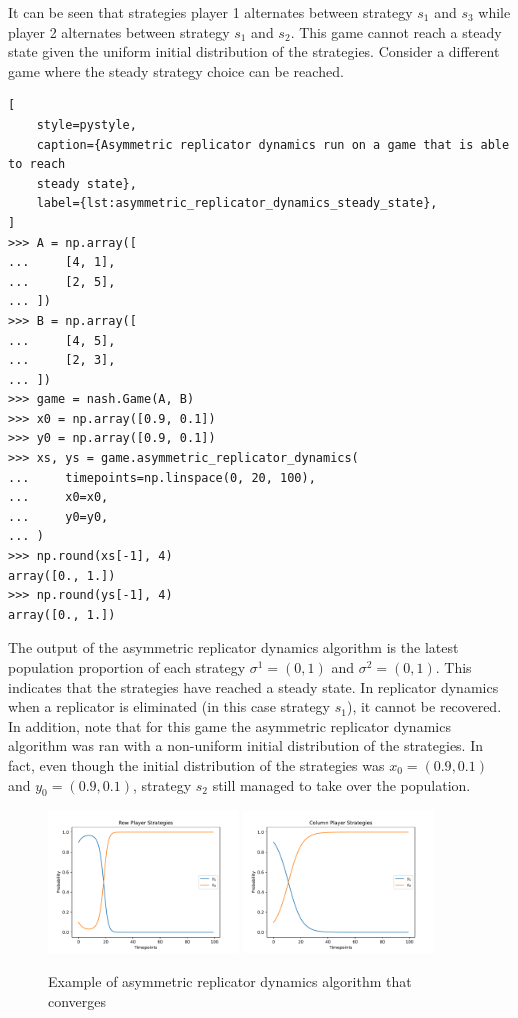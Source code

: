 It can be seen that strategies player 1 alternates between strategy \(s_1\) and
\(s_3\) while player 2 alternates between strategy \(s_1\) and \(s_2\).
This game cannot reach a steady state given the uniform initial distribution of
the strategies.
Consider a different game where the steady strategy choice can be reached.

\begin{lstlisting}[
    style=pystyle,
    caption={Asymmetric replicator dynamics run on a game that is able to reach
    steady state},
    label={lst:asymmetric_replicator_dynamics_steady_state},
]
>>> A = np.array([
...     [4, 1],
...     [2, 5],
... ])
>>> B = np.array([
...     [4, 5],
...     [2, 3],
... ])
>>> game = nash.Game(A, B)
>>> x0 = np.array([0.9, 0.1])
>>> y0 = np.array([0.9, 0.1])
>>> xs, ys = game.asymmetric_replicator_dynamics(
...     timepoints=np.linspace(0, 20, 100),
...     x0=x0,
...     y0=y0,
... )
>>> np.round(xs[-1], 4)
array([0., 1.])
>>> np.round(ys[-1], 4)
array([0., 1.])

\end{lstlisting}

The output of the asymmetric replicator dynamics algorithm is the latest
population proportion of each strategy \(\sigma^1 = (0, 1)\) and
\(\sigma^2 = (0, 1)\).
This indicates that the strategies have reached a steady state.
In replicator dynamics when a replicator is eliminated (in this case strategy
\(s_1\)), it cannot be recovered.
In addition, note that for this game the asymmetric replicator dynamics
algorithm was ran with a non-uniform initial distribution of the strategies.
In fact, even though the initial distribution of the strategies was
\(x_0 = (0.9, 0.1)\) and \(y_0 = (0.9, 0.1)\), strategy \(s_2\) still managed
to take over the population.

\begin{figure}[H]
    \centering
    \includegraphics[width=0.45\textwidth]{chapters/04_game_theoretic_model/Bin/learning_algorithms_example/asymmetric_rd_2_row.pdf}
    \includegraphics[width=0.45\textwidth]{chapters/04_game_theoretic_model/Bin/learning_algorithms_example/asymmetric_rd_2_col.pdf}
    \caption{Example of asymmetric replicator dynamics algorithm that converges}
    \label{fig:asymmetric_replicator_dynamics_steady}
\end{figure}


